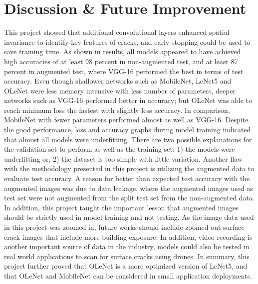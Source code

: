 \documentclass[conference]{IEEEtran}
\begin{document}
\section{Discussion & Future Improvement} 
This project showed that additional convolutional layers enhanced spatial invariance to identify key features of cracks, and early stopping could be used to save training time. As shown in results, all models appeared to have achieved high accuracies of at least 98 percent in non-augmented test, and at least 87 percent in augmented test, where VGG-16 performed the best in terms of test accuracy. Even though shallower networks such as MobileNet, LeNet5 and OLeNet were less memory intensive with less number of parameters, deeper networks such as VGG-16 performed better in accuracy; but OLeNet was able to reach minimum loss the fastest with slightly less accuracy. In comparison, MobileNet with fewer parameters performed almost as well as VGG-16. Despite the good performance, loss and accuracy graphs during model training indicated that almost all models were underfitting. There are two possible explanations for the validation set to perform as well as the training set: 1) the models were underfitting or, 2) the dataset is too simple with little variation. Another flaw with the methodology presented in this project is utilizing the augmented data to evaluate test accuracy. A reason for better than expected test accuracy with the augmented images was due to data leakage, where the augmented images used as test set were not augmented from the split test set from the non-augmented data. In addition, this project taught the important lesson that augmented images should be strictly used in model training and not testing. As the image data used in this project was zoomed in, future works should include zoomed out surface crack images that include more building exposure. In addition, video recording is another important source of data in the industry, models could also be tested in real world applications to scan for surface cracks using drones. In summary, this project further proved that OLeNet is a more optimized version of LeNet5, and that OLeNet and MobileNet can be considered in small application deployments.
\end{document}
